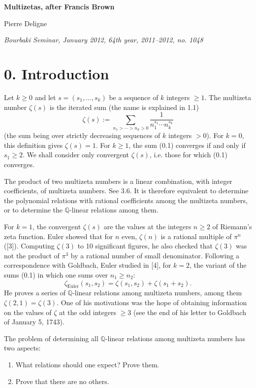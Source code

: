 \documentclass[11pt]{article}
\newcommand{\Q}{\mathbb Q}
\begin{document}
\begin{center}
{\Large\bfseries Multizetas, after Francis Brown}\par
\vspace{0.4em}
Pierre Deligne\par
\vspace{0.4em}
{\itshape Bourbaki Seminar, January 2012, 64th year, 2011--2012, no. 1048}
\end{center}

\section*{0. Introduction}

Let $k\geq 0$ and let $s=(s_1,\ldots,s_k)$ be a sequence of $k$ integers $\geq 1$.
The multizeta number $\zeta(s)$ is the iterated sum (the name is explained in 1.1)
\begin{equation}
\zeta(s):=\sum_{n_1>\cdots>n_k>0}\frac{1}{n_1^{s_1}\cdots n_k^{s_k}}
\tag{0.1}
\end{equation}
(the sum being over strictly decreasing sequences of $k$ integers $>0$).
For $k=0$, this definition gives $\zeta(s)=1$.
For $k\geq 1$, the sum (0.1) converges if and only if $s_1\geq 2$.
We shall consider only convergent $\zeta(s)$, i.e. those for which (0.1) converges.

The product of two multizeta numbers is a linear combination, with integer coefficients, of multizeta numbers. See 3.6.
It is therefore equivalent to determine the polynomial relations with rational coefficients among the multizeta numbers, or to determine the $\Q$-linear relations among them.

For $k=1$, the convergent $\zeta(s)$ are the values at the integers $n\geq 2$ of Riemann's zeta function.
Euler showed that for $n$ even, $\zeta(n)$ is a rational multiple of $\pi^n$ ([3]).
Computing $\zeta(3)$ to 10 significant figures, he also checked that $\zeta(3)$ was not the product of $\pi^3$ by a rational number of small denominator.
Following a correspondence with Goldbach, Euler studied in [4], for $k=2$, the variant of the sums (0.1) in which one sums over $n_1\geq n_2$:
\[
 \zeta_{\mathrm{Euler}}(s_1,s_2)=\zeta(s_1,s_2)+\zeta(s_1+s_2).
\]
He proves a series of $\Q$-linear relations among multizeta numbers, among them $\zeta(2,1)=\zeta(3)$.
One of his motivations was the hope of obtaining information on the values of $\zeta$ at the odd integers $\geq 3$ (see the end of his letter to Goldbach of January 5, 1743).

The problem of determining all $\Q$-linear relations among multizeta numbers has two aspects:
\begin{enumerate}[label=(\Alph*)]
\item What relations should one expect? Prove them.
\item Prove that there are no others.
\end{enumerate}
\end{document}
